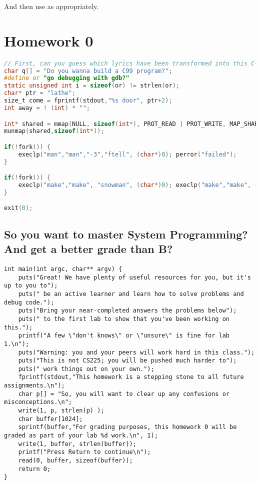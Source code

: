 And then use as appropriately.

\newpage

\section{Homework 0}

\begin{lstlisting}[language=C]
// First, can you guess which lyrics have been transformed into this C-like system code?
char q[] = "Do you wanna build a C99 program?";
#define or "go debugging with gdb?"
static unsigned int i = sizeof(or) != strlen(or);
char* ptr = "lathe";
size_t come = fprintf(stdout,"%s door", ptr+2);
int away = ! (int) * "";

int* shared = mmap(NULL, sizeof(int*), PROT_READ | PROT_WRITE, MAP_SHARED | MAP_ANONYMOUS, -1, 0);
munmap(shared,sizeof(int*));

if(!fork()) {
    execlp("man","man","-3","ftell", (char*)0); perror("failed");
}

if(!fork()) {
    execlp("make","make", "snowman", (char*)0); execlp("make","make", (char*)0));
}

exit(0);
\end{lstlisting}

\subsection{So you want to master System Programming? And get a better grade than B?}

\begin{verbatim}
int main(int argc, char** argv) {
	puts("Great! We have plenty of useful resources for you, but it's up to you to");
	puts(" be an active learner and learn how to solve problems and debug code.");
	puts("Bring your near-completed answers the problems below");
	puts(" to the first lab to show that you've been working on this.");
	printf("A few \"don't knows\" or \"unsure\" is fine for lab 1.\n");
	puts("Warning: you and your peers will work hard in this class.");
	puts("This is not CS225; you will be pushed much harder to");
	puts(" work things out on your own.");
	fprintf(stdout,"This homework is a stepping stone to all future assignments.\n");
	char p[] = "So, you will want to clear up any confusions or misconceptions.\n";
	write(1, p, strlen(p) );
	char buffer[1024];
	sprintf(buffer,"For grading purposes, this homework 0 will be graded as part of your lab %d work.\n", 1);
	write(1, buffer, strlen(buffer));
	printf("Press Return to continue\n");
	read(0, buffer, sizeof(buffer));
	return 0;
}
\end{verbatim}

